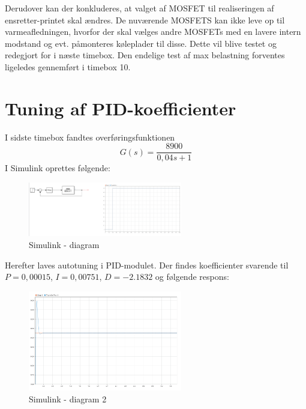 Derudover kan der konkluderes, at valget af MOSFET til realiseringen af ensretter-printet skal ændres. De nuværende MOSFETS kan ikke leve op til varmeafledningen, hvorfor der skal vælges andre MOSFETs med en lavere intern modstand og evt. påmonteres køleplader til disse. 
Dette vil blive testet og redegjort for i næste timebox. Den endelige test af max belastning forventes ligeledes gennemført i timebox 10. 
    
\clearpage

\section{Tuning af PID-koefficienter}
\label{sec:tuning-af-pid}

I sidste timebox fandtes overføringsfunktionen
\begin{equation}
  \label{eq:1}
G(s) = \frac{8900}{0,04s+1}  
\end{equation}
I Simulink oprettes følgende:

\begin{figure}[h]
  \centering
  \includegraphics[width=0.6\textwidth]{sbil1.png}
  \caption{Simulink - diagram}
  \label{fig:sbil1}
\end{figure}

Herefter laves autotuning i PID-modulet. Der findes koefficienter svarende til $P=0,00015$, $I=0,00751$, $D=-2.1832$ og følgende respons:

\begin{figure}[h]
  \centering
  \includegraphics[width=0.6\textwidth]{sbil2.png}
  \caption{Simulink - diagram 2}
  \label{fig:sbil1}
\end{figure}

